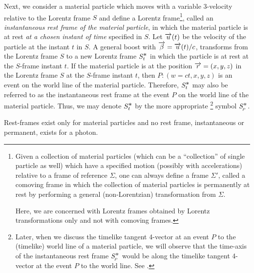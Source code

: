 Next,  we consider a material particle which moves with 
a 
{variable} 3-velocity relative to the Lorentz frame 
$S$ 
and define a Lorentz frame\footnote{Given a collection 
of 
material particles (which can be a ``collection'' of 
single 
particle as well) which have a specified motion 
(possibly 
with accelerations) relative to a frame of reference 
$\Sigma$, one can always define a frame $\Sigma'$, 
called a 
{comoving frame} in which the collection of material 
particles is permanently at rest by performing a 
general 
(non-Lorentzian) transformation from $\Sigma$.

Here, we are concerned with Lorentz frames obtained by 
Lorentz transformations only and not with comoving 
frames.}, 
called an \textsl{instantaneous rest frame of the 
material 
particle}, in which the material particle is at rest 
\textsl{at a chosen instant of time} specified in $S$. 
Let 
$\overrightarrow{u}(t)$ be the velocity of the particle at the 
instant 
$t$ in $S$. A {general boost} with 
$\overrightarrow{{\beta}}=\overrightarrow{u}(t)/c$, 
transforms from the Lorentz frame $S$ to a new Lorentz 
frame 
${S}^{{\textstyle \ast}}_t$ in which the particle is at rest at the 
$S$-frame instant $t$. If the material particle is at 
the 
position $\overrightarrow{r}=(x,y,z)$ in the Lorentz frame $S$ at 
the 
$S$-frame instant $t$, then $P :(w=ct,x,y,z)$ is an 
event on 
the world line of the material particle. Therefore,  
${S}^{{\textstyle \ast}}_t$ may also be referred to as the 
instantaneous 
rest frame at the event $P$ on the world line of the 
material particle. Thus, we may denote ${S}^{{\textstyle \ast}}_t$ 
by the 
more appropriate \footnote{Later, when we discuss the 
timelike tangent 4-vector at an event $P$ to the 
(timelike) 
world line of a material particle, we will observe that 
the 
time-axis of the instantaneous rest frame 
${S}^{{\textstyle \ast}}_{_{\hspace*{-1.5pt}{P}}}$  would be along the timelike 
tangent 
4-vector at the event $P$ to the world line. See 
.} symbol ${S}^{{\textstyle \ast}}_{_{\hspace*{-1.5pt}{P}}}$.

 Rest-frames exist only for material 
particles 
and no rest frame, instantaneous or permanent, exists 
for a 
photon.

